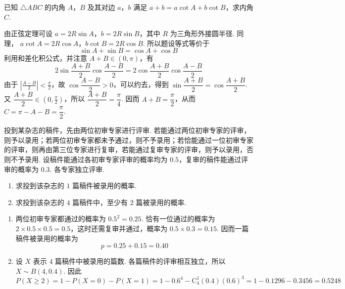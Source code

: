 \begin{problem}
已知 \(\triangle ABC\) 的内角 \(A\)，\(B\) 及其对边 \(a\)，\(b\) 满足 \(a + b = a \cot A + b \cot B\)，求内角 \(C\).
\end{problem}

\begin{solution}
由正弦定理可设 \(a=2R\sin A\)，\(b=2R\sin B\)，其中 \(R\) 为三角形外接圆半径. 同理，
\(a\cot A=2R\cos A\)，\(b\cot B=2R\cos B\). 所以题设等式等价于
\[
\sin A+\sin B=\cos A+\cos B
\]
利用和差化积公式，并注意 \(A+B\in(0,\pi)\)，有
\[
2\sin\frac{A+B}{2}\cos\frac{A-B}{2}
=2\cos\frac{A+B}{2}\cos\frac{A-B}{2}
\]
由于 \(\left|\frac{A-B}{2}\right|<\frac{\pi}{2}\)，故
\(\cos\dfrac{A-B}{2}>0\)，可以约去，得到
\(\sin\dfrac{A+B}{2}=\cos\dfrac{A+B}{2}\). 又
\(\dfrac{A+B}{2}\in(0,\frac{\pi}{2})\)，所以
\(\dfrac{A+B}{2}=\dfrac{\pi}{4}\). 因而 \(A+B=\dfrac{\pi}{2}\)，从而
\(C=\pi-A-B=\dfrac{\pi}{2}\).
\end{solution}

\begin{problem}
投到某杂志的稿件，先由两位初审专家进行评审. 若能通过两位初审专家的评审，则予以录用；若两位初审专家都未予通过，则不予录用；若恰能通过一位初审专家的评审，则再由第三位专家进行复审，若能通过复审专家的评审，则予以录用，否则不予录用. 设稿件能通过各初审专家评审的概率均为 \(0.5\)，复审的稿件能通过评审的概率为 \(0.3\). 各专家独立评审.

\begin{enumerate}
\item 求投到该杂志的 \(1\text{ 篇}\)稿件被录用的概率.
\item 求投到该杂志的 \(4\text{ 篇}\)稿件中，至少有 \(2\text{ 篇}\)被录用的概率.
\end{enumerate}
\end{problem}

\begin{solution}
\begin{enumerate}
\item 两位初审专家都通过的概率为 \(0.5^2=0.25\). 恰有一位通过的概率为
\(2\times0.5\times0.5=0.5\)，这时还需复审并通过，概率为 \(0.5\times0.3=0.15\). 因而一篇稿件被录用的概率为
\[
p=0.25+0.15=0.40
\]
\item 设 \(X\) 表示 \(4\) 篇稿件中被录用的篇数. 各篇稿件的评审相互独立，所以
\(X\sim B(4,0.4)\). 因此
\[
P(X\geqslant2)=1-P(X=0)-P(X=1)
=1-0.6^4-\mathrm C_4^1(0.4)(0.6)^3
=1-0.1296-0.3456=0.5248
\]
\end{enumerate}
\end{solution}

